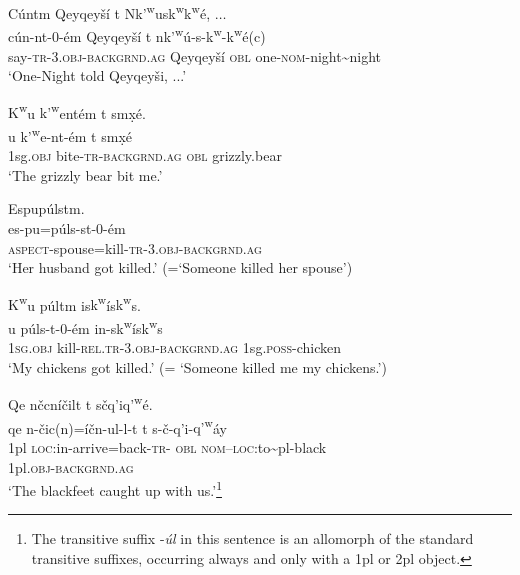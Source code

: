 \documentclass[output=paper,colorlinks,citecolor=brown]{langscibook}
\begin{document}
\ea 
\label{ex-thomason-18}
C\'untm Qeyqey\v{s}\'i t N{k'\textsuperscript w}us{k\textsuperscript w}{k\textsuperscript w}\textglotstop\'e, $\ldots$ \\
 \gll c\'un-nt-0-\'em Qeyqey\v{s}\'i t
n{k'\textsuperscript w}\'u\textglotstop-s-{k\textsuperscript w}-{k\textsuperscript w}\textglotstop\'e(c) \\
say-\textsc{tr}-3.\textsc{obj}-\textsc{backgrnd.ag} Qeyqey\v{s}\'i \textsc{obl} one-\textsc{nom}-night\textasciitilde{}night \\
 \glt `One-Night told Qeyqey\v{s}i, ...'
 \z

\ea 
\label{ex-thomason-19}
{K\textsuperscript w}u {k'\textsuperscript w}e{\textglotstop}nt\'em t sm\d{x}\'e. \\
u {k'\textsuperscript
 w}e{\textglotstop}-nt-\'em t sm\d{x}\'e\\
1sg.\textsc{obj} bite-\textsc{tr}-\textsc{backgrnd.ag} \textsc{obl} grizzly.bear\\
\glt `The grizzly bear bit me.'
\z


\ea 
\label{ex-thomason-20}
Espu{\textglotstop}p\'ulstm.  \\
\gll es-pu\textglotstop=p\'uls-st-0-\'em \\
\textsc{aspect}-spouse=kill-\textsc{tr}-3.\textsc{obj}-\textsc{backgrnd.ag}\\
\glt `Her husband got killed.' (=`Someone killed her spouse')
\z

\ea 
\label{ex-thomason-21}
{K\textsuperscript w}u p\'ul{\textltilde}tm is{k\textsuperscript w}\'is{k\textsuperscript w}s. \\
u p\'uls-{\textltilde}t-0-\'em
in-s{k\textsuperscript w}\'is{k\textsuperscript w}s\\
\textsc{1sg.obj} kill-\textsc{rel.tr}-3.\textsc{obj}-\textsc{backgrnd.ag} 1sg.\textsc{poss}-chicken\\
\glt `My chickens got killed.' (= `Someone killed me my chickens.')
\z

\ea 
\label{ex-thomason-22}
Qe n\v{c}cn\'i\v{c}i{\textltilde}lt t s\v{c}q'i{q'\textsuperscript w}\'e.  \\
 \gll qe n-\v{c}ic(n)=\'i\v{c}n-{\textltilde}ul-l-t t
s-\v{c}-q'i-{q'\textsuperscript w}\'ay\\
1pl \textsc{loc}:in-arrive=back-\textsc{tr}-
\textsc{obl} \textsc{nom}--\textsc{loc}:to\textasciitilde{}pl-black\\
1pl.\textsc{obj}-\textsc{backgrnd.ag}\\
 \glt `The blackfeet caught up with
us.'\footnote{The transitive suffix -\emph{{\textltilde}\'ul} in this
sentence is an allomorph of the standard transitive suffixes,
occurring always and only with a 1pl or 2pl object.}
\z
\end{document}
